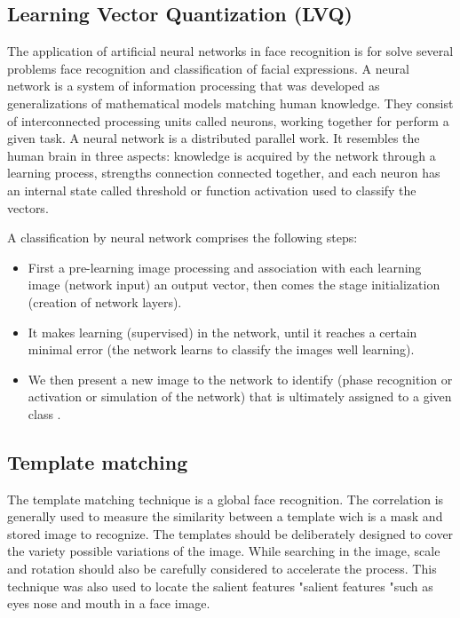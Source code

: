 \subsection{Learning Vector Quantization (LVQ)}
The application of artificial neural networks in face recognition is for solve several problems face recognition and
classification of facial expressions.
A neural network is a system of information processing that was developed
as generalizations of mathematical models matching human knowledge. They
consist of interconnected processing units called neurons,
working together for perform a given task.
A neural network is a distributed parallel work. It resembles the human brain in three
aspects: knowledge is acquired by the network through a learning process, strengths
connection connected together, and each neuron has an internal state called threshold or function
activation used to classify the vectors.

A classification by neural network comprises the following steps:
\begin{itemize}
\item First a pre-learning image processing and association with each learning image (network input) an output vector, then comes the stage initialization (creation of network layers). 
\item It makes learning (supervised) in the network,
until it reaches a certain minimal error (the network learns to classify the images well
learning). 
\item We then present a new image to the network to identify (phase
recognition or activation or simulation of the network) that is ultimately assigned to a
given class . 
\end{itemize}

\subsection{Template matching}
The template matching technique is a global face recognition\cite{Image-Based}. The correlation
is generally used to measure the similarity between a template wich is a mask and stored
image to recognize. The templates should be deliberately designed to cover the variety
possible variations of the image.
While searching in the image, scale and rotation should also be
carefully considered to accelerate the process.
This technique was also used to locate the salient features "salient
features "such as eyes nose and mouth in a face image.

